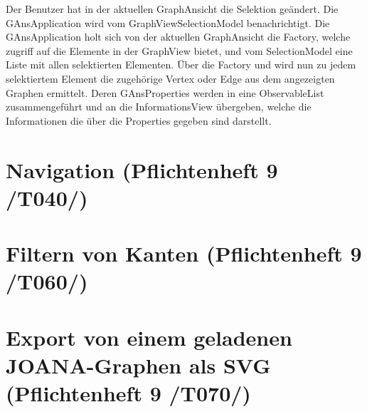Der Benutzer hat in der aktuellen GraphAnsicht die Selektion geändert. Die GAnsApplication wird vom GraphViewSelectionModel benachrichtigt. Die GAnsApplication holt sich von der aktuellen GraphAnsicht die Factory, welche zugriff auf die Elemente in der GraphView bietet, und vom SelectionModel eine Liste mit allen selektierten Elementen. Über die Factory und wird nun zu jedem selektiertem Element die zugehörige Vertex oder Edge aus dem angezeigten Graphen ermittelt. Deren GAnsProperties werden in eine ObservableList zusammengeführt und an die InformationsView übergeben, welche die Informationen die über die Properties gegeben sind darstellt.

\section{Navigation (Pflichtenheft 9 /T040/)}

\section{Filtern von Kanten (Pflichtenheft 9 /T060/)}

\section{Export von einem geladenen JOANA-Graphen als SVG (Pflichtenheft 9 /T070/)}